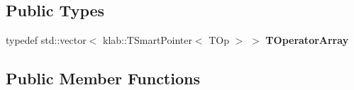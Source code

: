 \subsection*{Public Types}
\begin{DoxyCompactItemize}
\item 
typedef std\+::vector$<$ klab\+::\+T\+Smart\+Pointer$<$ T\+Op $>$ $>$ {\bfseries T\+Operator\+Array}\hypertarget{classkl1p_1_1TBlockTridiagonalOperator_a1e93b7a33162d0a67de0c2fbf47d6f9c}{}\label{classkl1p_1_1TBlockTridiagonalOperator_a1e93b7a33162d0a67de0c2fbf47d6f9c}

\end{DoxyCompactItemize}
\subsection*{Public Member Functions}
